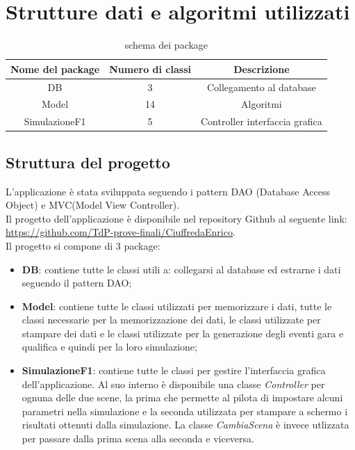 \chapter{Strutture dati e algoritmi utilizzati}
\label{sec:strutture dati e algoritmi utilizzati}

\begin{table}[]
    \centering
    \setcellgapes{3pt}
    \makegapedcells
    \begin{tabular}{|c|c|c|}
    \hline
    \textbf{Nome del package} & \textbf{Numero di classi} & \textbf{Descrizione}\\ \hline
    DB & 3 & Collegamento al database\\ \hline
    Model & 14 & Algoritmi\\ \hline
    SimulazioneF1 & 5 & Controller interfaccia grafica\\ \hline
    \end{tabular}
    \caption{schema dei package}
    \label{tab:schema dei package}
\end{table}
\section[Struttura del progetto]{Struttura del progetto} %
L'applicazione è stata sviluppata seguendo i pattern DAO (Database Access Object) e MVC(Model View Controller).\\
Il progetto dell'applicazione è disponibile nel repository Github al seguente link: \href{https://github.com/TdP-prove-finali/CiuffredaEnrico}{https://github.com/TdP-prove-finali/CiuffredaEnrico}.\\
Il progetto si compone di 3 package:
\begin{itemize}

    \item\textbf{ DB}: contiene tutte le classi utili a: collegarsi al database ed estrarne i dati seguendo il pattern DAO;
    \item \textbf{Model}: contiene tutte le classi utilizzati per memorizzare i dati, tutte le classi necessarie per la memorizzazione dei dati, le classi utilizzate per stampare dei dati e le classi utilizzate per la generazione degli eventi gara e qualifica e quindi per la loro simulazione;
    \item \textbf{SimulazioneF1}: contiene tutte le classi per gestire l'interfaccia grafica dell'applicazione. Al suo interno è disponibile una classe \textit{Controller} per ognuna delle due scene, la prima che permette al pilota di impostare alcuni parametri nella simulazione e la seconda utilizzata per stampare a schermo i risultati ottenuti dalla simulazione. La classe \textit{CambiaScena} è invece utlizzata per passare dalla prima scena alla seconda e viceversa.
\end{itemize}
